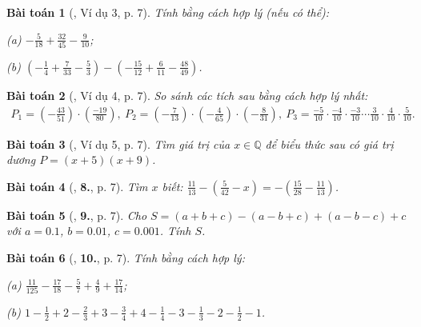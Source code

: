 \documentclass{article}
\numberwithin{equation}{section}
\newtheorem{baitoan}{Bài toán}[section]
\begin{document}
\begin{baitoan}[\cite{Tuyen_Toan_7}, Ví dụ 3, p. 7]
	Tính bằng cách hợp lý (nếu có thể):\\
	\begin{enumerate*}
		\item[(a)] $-\frac{5}{18} + \frac{32}{45} - \frac{9}{10}$;
		\item[(b)] $\left(-\frac{1}{4} + \frac{7}{33} - \frac{5}{3}\right) - \left(-\frac{15}{12} + \frac{6}{11} - \frac{48}{49}\right)$.
	\end{enumerate*}
\end{baitoan}

\begin{baitoan}[\cite{Tuyen_Toan_7}, Ví dụ 4, p. 7]
	So sánh các tích sau bằng cách hợp lý nhất:
	\begin{align*}
		P_1 = \left(-\frac{43}{51}\right)\cdot\left(\frac{-19}{80}\right),\ P_2 = \left(-\frac{7}{13}\right)\cdot\left(-\frac{4}{65}\right)\cdot\left(-\frac{8}{31}\right),\ P_3 = \frac{-5}{10}\cdot\frac{-4}{10}\cdot\frac{-3}{10}\cdots\frac{3}{10}\cdot\frac{4}{10}\cdot\frac{5}{10}.
	\end{align*}
\end{baitoan}

\begin{baitoan}[\cite{Tuyen_Toan_7}, Ví dụ 5, p. 7]
	Tìm giá trị của $x\in\mathbb{Q}$ để biểu thức sau có giá trị dương  $P = (x + 5)(x + 9)$.
\end{baitoan}

\begin{baitoan}[\cite{Tuyen_Toan_7}, \textbf{8.}, p. 7]
	Tìm $x$ biết: $\frac{11}{13} - \left(\frac{5}{42} - x\right) = -\left(\frac{15}{28} - \frac{11}{13}\right)$.
\end{baitoan}

\begin{baitoan}[\cite{Tuyen_Toan_7}, \textbf{9.}, p. 7]
	Cho $S = (a + b + c) - (a - b + c) + (a - b - c) + c$ với $a = 0.1$, $b = 0.01$, $c = 0.001$. Tính $S$.
\end{baitoan}

\begin{baitoan}[\cite{Tuyen_Toan_7}, \textbf{10.}, p. 7]
	Tính bằng cách hợp lý:\\
	\begin{enumerate*}
		\item[(a)] $\frac{11}{125} - \frac{17}{18} - \frac{5}{7} + \frac{4}{9} + \frac{17}{14}$;
		\item[(b)] $1 - \frac{1}{2} + 2 - \frac{2}{3} + 3 - \frac{3}{4} + 4 - \frac{1}{4} - 3 - \frac{1}{3} - 2 - \frac{1}{2} - 1$.
	\end{enumerate*}
\end{baitoan}
\end{document}
